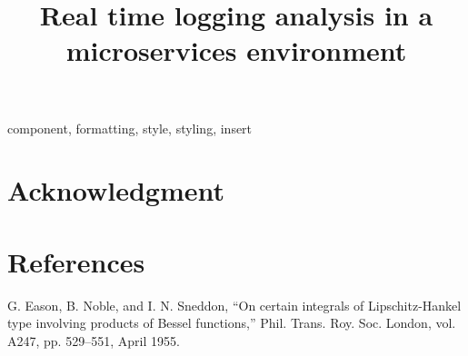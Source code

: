 \documentclass[conference]{IEEEtran}
\begin{document}
\title{Real time logging analysis in a microservices environment\\
}

\author{
}

\maketitle


\begin{IEEEkeywords}
component, formatting, style, styling, insert
\end{IEEEkeywords}


\section*{Acknowledgment}

\section*{References}

\begin{thebibliography}{00}
 G. Eason, B. Noble, and I. N. Sneddon, ``On certain integrals of Lipschitz-Hankel type involving products of Bessel functions,'' Phil. Trans. Roy. Soc. London, vol. A247, pp. 529--551, April 1955.
\end{thebibliography}
\vspace{12pt}
\end{document}
